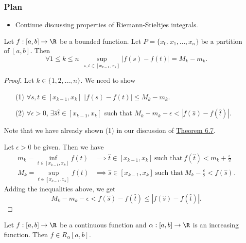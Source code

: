 \subsubsection{Plan}

\begin{itemize}
    \item Continue discussing properties of Riemann-Stieltjes integrals.
\end{itemize}


\begin{lemma}\label{lemma 1}
    Let \( f:[a,b] \to \R  \) be a bounded function. Let \( P = \{  {x}_{0}, {x}_{1}, \dots, {x}_{n} \}  \) be a partition of \( [a,b] \). Then 
    \[  \forall 1 \leq k \leq n \ \ \sup_{s,t \in [{x}_{k-1}, {x}_{k}]} | f(s) -f(t) | = {M}_{k } -{m}_{k }. \]
\end{lemma}
\begin{proof}
Let \( k \in \{  1, 2 , \dots, n \}  \). We need to show
\begin{enumerate}
    \item[(1)] \( \forall s,t \in [{x}_{k-1}, {x}_{k}] \) \( | f(s) - f(t) |  \leq {M}_{k } - {m}_{k} \).
    \item[(2)] \( \forall \epsilon >0  \), \( \exists \hat{s} \hat{t} \in [{x}_{k-1}, {x}_{k}]  \) such that \( {M}_{k } - {m}_{k } - \epsilon < | f(\hat{s}) - f(\hat{t}) |  \). 
\end{enumerate}
Note that we have already shown (1) in our discussion of {\hyperref[Rudin 6.7]{Theorem 6.7}}. 

Let \( \epsilon > 0  \) be given. Then we have
\begin{align*}
    {m}_{k } = \inf_{t \in [{x}_{k-1}, {x}_{k}]} f(t) &\implies \hat{t} \in [{x}_{k-1}, {x}_{k}] \ \text{such that} \ f(\hat{t}) < {m}_{k } + \frac{ \epsilon }{ 2 }  \\
    {M}_{k }  = \sup_{t \in [{x}_{k-1}, {x}_{k}]} f(t) &\implies \hat{s} \in [{x}_{k-1}, {x}_{k}] \ \text{such that} \ {M}_{k }  - \frac{ \epsilon }{ 2 }  < f(\hat{s}).
\end{align*}
Adding the inequalities above, we get
\[  {M}_{k } - {m}_{k } - \epsilon < f(\hat{s}) - f(\hat{t}) \leq | f(\hat{s}) - f(\hat{t}) |. \]
\end{proof}

\begin{theorem}[Rudin 6.8]\label{Rudin 6.8}
    Let \( f:[a,b] \to \R  \) be a continuous function and \( \alpha: [a,b] \to \R  \) is an increasing function. Then \( f \in {R}_{\alpha}[a,b] \). 
\end{theorem}

